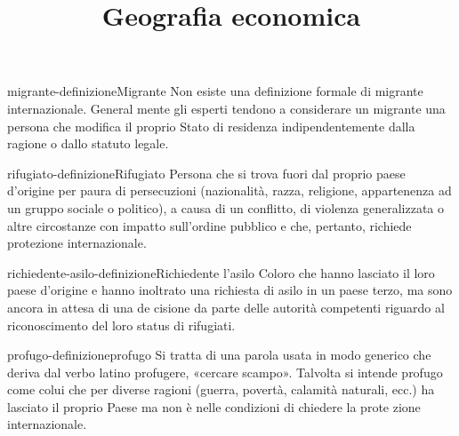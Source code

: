 \documentclass[preview]{standalone}
\begin{document}
\title{Geografia economica}
\genpage

\begin{snippetdefinition}{migrante-definizione}{Migrante}
    Non esiste una definizione formale di migrante internazionale. General
    mente gli esperti tendono a considerare un migrante una persona che
    modifica il proprio Stato di residenza indipendentemente dalla ragione
    o dallo statuto legale.
\end{snippetdefinition}

\begin{snippetdefinition}{rifugiato-definizione}{Rifugiato}
    Persona che si trova fuori dal proprio paese d'origine per paura di persecuzioni
    (nazionalità, razza, religione, appartenenza ad un gruppo sociale o politico),
    a causa di un conflitto, di violenza generalizzata o altre
    circostanze con impatto sull'ordine pubblico e che, pertanto, richiede
    protezione internazionale.
\end{snippetdefinition}

\begin{snippetdefinition}{richiedente-asilo-definizione}{Richiedente l'asilo}
    Coloro che hanno lasciato il loro paese d'origine e hanno inoltrato una
    richiesta di asilo in un paese terzo, ma sono ancora in attesa di una
    de cisione da parte delle autorità competenti riguardo al riconoscimento
    del loro status di rifugiati.
\end{snippetdefinition}

\begin{snippetdefinition}{profugo-definizione}{profugo}
    Si tratta di una parola usata in modo generico che deriva dal verbo latino
    profugere, «cercare scampo». Talvolta si intende profugo come
    colui che per diverse ragioni (guerra, povertà, calamità naturali, ecc.) ha
    lasciato il proprio Paese ma non è nelle condizioni di chiedere la prote zione internazionale.
\end{snippetdefinition}


\newcommand{\greenbox}{
    \fcolorbox{black}{green}{\rule{0pt}{5pt}\rule{5pt}{0pt}}
}

\newcommand{\redbox}{
    \fcolorbox{black}{red}{\rule{0pt}{5pt}\rule{5pt}{0pt}}
}
\end{document}
